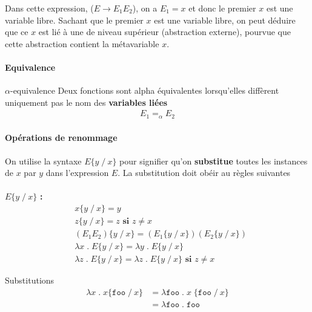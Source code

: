 \documentclass{report}
\begin{document}
\begin{multicols*}{3}
\begin{EExample}{}{}
        Dans cette expression, ($E \rightarrow E_1 E_2$), on a 
        $E_1 = x$ et donc le premier $x$  est une variable libre. 
        Sachant que le premier $x$ est une variable libre, on peut déduire 
        que ce $x$ est lié à une de niveau supérieur (abstraction externe),
        pourvue que cette abstraction contient la métavariable $x$. 
    \end{EExample}


    \paragraph{Equivalence}

    \begin{Definitionx}{$\alpha$-equivalence}{}
        Deux fonctions sont alpha équivalentes lorsqu'elles 
        diffèrent uniquement pas le nom des \textbf{variables liées}  
        \begin{align*}
          E_1 =_\alpha E_2
        \end{align*}
    \end{Definitionx}

    \paragraph{Opérations de renommage}
    On utilise la syntaxe $E\{ y \; /\ x \}$ pour signifier 
    qu'on \textbf{substitue} toutes les instances de $x$ par $y$ 
    dans l'expression $E$. La substitution doit obéir au règles suivantes 
    \mbox{}
    \\\\
    $E \{ y  \; /\ x\}$ \textbf{:}  
    \begin{align*}
      & x \{ y \; /\ x \} = y 
      \\ 
      & z \{ y \; /\ x \} = z \textbf{ si } z \neq x 
      \\   
      & (E_1 E_2) \{ y \; /\ x \} = 
          (E_1 \{ y \; /\ x \}) 
          (E_2 \{ y \; /\ x \}) 
          \\ 
      & \lambda x \; . \; E \{ y \; /\ x \} = 
        \lambda y \; . \; E \{ y \; /\ x \} 
        \\ 
      & \lambda z \; . \; E \{ y \; /\ x \} = 
        \lambda z \; . \; E \{ y \; /\ x \} 
        \textbf{ si } z \neq x   
    \end{align*}
  \begin{EExample}{Substitutions}{}
      \begin{align*}
        \lambda x \; . \; x \{ \texttt{foo} \; /\ x  \}
        &=
        \lambda \texttt{foo} \; . \; x \; \{ \texttt{foo} \; /\ x  \} \\
        &=
        \lambda \texttt{foo} \; . \;  \texttt{foo}    
      \end{align*}


\end{EExample}
\end{multicols*}
\end{document}
